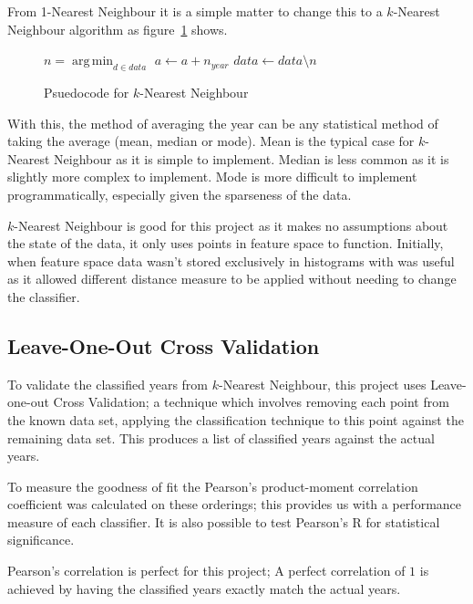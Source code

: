 From 1-Nearest Neighbour it is a simple matter to change this to a $k$-Nearest Neighbour algorithm
as figure~\ref{fig:knn} shows.

\begin{figure}[h]
\begin{algorithmic}
\State $n = \operatorname*{arg\,min}_{d \in data}$ 
\State $a \gets a + n_{year}$
\State $data \gets data \setminus n$
\EndFor
\State \Return {}
\EndFunction
\end{algorithmic}
\caption{Psuedocode for $k$-Nearest Neighbour}\label{fig:knn}
\end{figure}

With this, the method of averaging the year can be any statistical method of taking the average
(mean, median or mode). Mean is the typical case for $k$-Nearest Neighbour as it is simple to
implement. Median is less common as it is slightly more complex to implement. Mode is more 
difficult to implement programmatically, especially given the sparseness of the data. 

$k$-Nearest Neighbour is good for this project as it makes no assumptions about the state of the
data, it only uses points in feature space to function. Initially, when feature space data wasn't
stored exclusively in histograms with was useful as it allowed different distance measure to be
applied without needing to change the classifier.


\subsection{Leave-One-Out Cross Validation}
To validate the classified years from $k$-Nearest Neighbour, this project uses Leave-one-out Cross
Validation; a technique which involves removing each point from the known data set, applying the
classification technique to this point against the remaining data set. This produces a list of
classified years against the actual years.

To measure the goodness of fit the Pearson's product-moment correlation coefficient was 
calculated on these orderings; this provides us with a performance measure of each classifier. 
It is also possible to test Pearson's R for statistical significance.

Pearson's correlation is perfect for this project; A perfect correlation of $1$ is achieved by
having the classified years exactly match the actual years.

